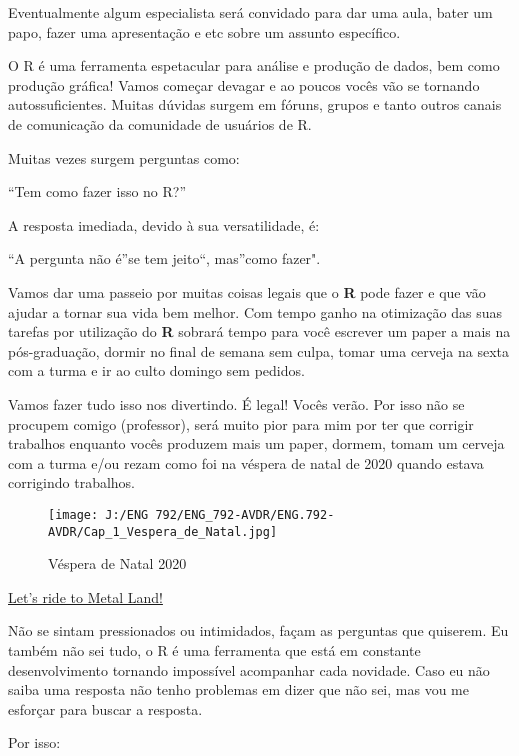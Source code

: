 \documentclass[
]{book}
\begin{document}
Eventualmente algum especialista será convidado para dar uma aula, bater um papo, fazer uma apresentação e etc sobre um assunto específico.

O R é uma ferramenta espetacular para análise e produção de dados, bem como produção gráfica! Vamos começar devagar e ao poucos vocês vão se tornando autossuficientes.
Muitas dúvidas surgem em fóruns, grupos e tanto outros canais de comunicação da comunidade de usuários de R.

Muitas vezes surgem perguntas como:

``Tem como fazer isso no R?''

A resposta imediada, devido à sua versatilidade, é:

``A pergunta não é''se tem jeito``, mas''como fazer".

Vamos dar uma passeio por muitas coisas legais que o \textbf{R} pode fazer e que vão ajudar a tornar sua vida bem melhor. Com tempo ganho na otimização das suas tarefas por utilização do \textbf{R} sobrará tempo para você escrever um paper a mais na pós-graduação, dormir no final de semana sem culpa, tomar uma cerveja na sexta com a turma e ir ao culto domingo sem pedidos.

Vamos fazer tudo isso nos divertindo. É legal! Vocês verão. Por isso não se procupem comigo (professor), será muito pior para mim por ter que corrigir trabalhos enquanto vocês produzem mais um paper, dormem, tomam um cerveja com a turma e/ou rezam como foi na véspera de natal de 2020 quando estava corrigindo trabalhos.

\begin{figure}
\hypertarget{id}{%
\centering
\texttt{[image: J:/ENG 792/ENG\_792-AVDR/ENG.792-AVDR/Cap\_1\_Vespera\_de\_Natal.jpg]}
\caption{Véspera de Natal 2020}\label{id}
}
\end{figure}

\href{https://www.youtube.com/watch?v=N8E4s8yAoX4\&ab_channel=MassacrationOficial}{Let's ride to Metal Land!}

Não se sintam pressionados ou intimidados, façam as perguntas que quiserem. Eu também não sei tudo, o R é uma ferramenta que está em constante desenvolvimento tornando impossível acompanhar cada novidade. Caso eu não saiba uma resposta não tenho problemas em dizer que não sei, mas vou me esforçar para buscar a resposta.

Por isso:
\end{document}

